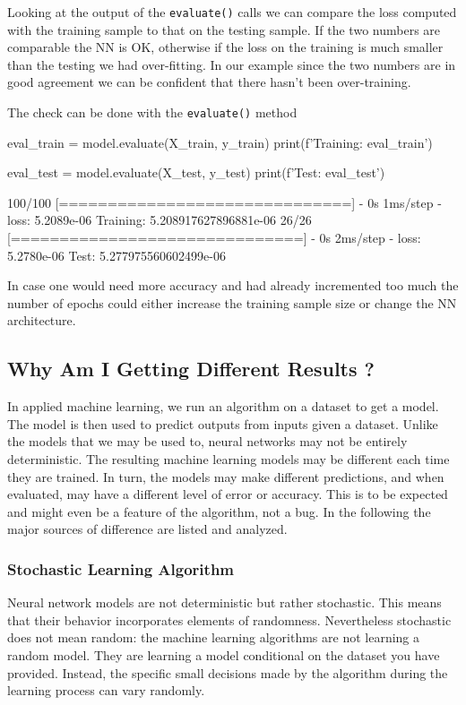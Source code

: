 Looking at the output of the \texttt{evaluate()} calls we can compare the loss computed with the training sample to that on the testing sample. If the two numbers are comparable the NN is OK, otherwise if the loss on the training is much smaller than the testing we had over-fitting.
In our example since the two numbers are in good agreement we can be confident that there hasn't been over-training.

The check can be done with the \texttt{evaluate()} method

\begin{ipython}
eval_train = model.evaluate(X_train, y_train)
print(f'Training: {eval_train}')

eval_test = model.evaluate(X_test, y_test)
print(f'Test: {eval_test}')
\end{ipython}
\begin{ioutput}
100/100 [==============================] - 0s 1ms/step - loss: 5.2089e-06
Training: 5.208917627896881e-06
26/26 [==============================] - 0s 2ms/step - loss: 5.2780e-06
Test: 5.277975560602499e-06
\end{ioutput}

In case one would need more accuracy and had already incremented too much the number of epochs could either increase the training sample size or change the NN architecture.

\subsection{Why Am I Getting Different Results ?}

In applied machine learning, we run an algorithm on a dataset to get a model. The model is then used to predict outputs from inputs given a dataset. Unlike the models that we may be used to, neural networks may not be entirely deterministic.
The resulting machine learning models may be different each time they are trained. In turn, the models may make different predictions, and when evaluated, may have a different level of error or accuracy. This is to be expected and might even be a feature of the algorithm, not a bug.
In the following the major sources of difference are listed and analyzed.

\subsubsection{Stochastic Learning Algorithm}

Neural network models are not deterministic but rather stochastic. This means that their behavior incorporates elements of randomness.
Nevertheless stochastic does not mean random: the machine learning algorithms are not learning a random model. They are learning a model conditional on the dataset you have provided. Instead, the specific small decisions made by the algorithm during the learning process can vary randomly.

